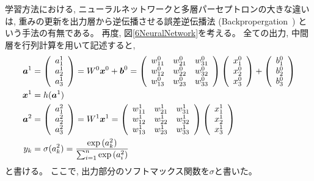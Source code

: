 学習方法における, ニューラルネットワークと多層パーセプトロンの大きな違いは, 重みの更新を出力層から逆伝播させる誤差逆伝播法 (Backpropergation~\cite{Backpropagation}) という手法の有無である。
再度, 図\ref{6NeuralNetwork}を考える。
全ての出力, 中間層を行列計算を用いて記述すると, 
\begin{equation}
 \begin{split}
  {\mbox{\boldmath{$a$}}}^1&=
  \left(
    \begin{array}{ccc}
      a^1_1 \\
      a^1_2 \\
      a^1_3 
    \end{array}
  \right)
  =
  W^0{\mbox{\boldmath{$x$}}}^0 + {\mbox{\boldmath{$b$}}}^0
  =
  \left(
    \begin{array}{ccc}
      w^0_{11} & w^0_{21} & w^0_{31} \\
      w^0_{12} & w^0_{22} & w^0_{32} \\
      w^0_{13} & w^0_{23} & w^0_{33}
    \end{array}
  \right)
  \left(
    \begin{array}{ccc}
      x^0_1 \\
      x^0_2 \\
      x^0_3
    \end{array}
  \right)
  +
  \left(
    \begin{array}{ccc}
      b^0_1 \\
      b^0_2 \\
      b^0_3
    \end{array}
  \right)\\
  {\mbox{\boldmath{$x$}}}^1&=h({\mbox{\boldmath{$a$}}}^1)\\
  {\mbox{\boldmath{$a$}}}^2&=
  \left(
    \begin{array}{ccc}
      a^2_1 \\
      a^2_2 \\
      a^2_3 
    \end{array}
  \right)
  =
  W^1{\mbox{\boldmath{$x$}}}^1
  =
  \left(
    \begin{array}{ccc}
      w^1_{11} & w^1_{21} & w^1_{31} \\
      w^1_{12} & w^1_{22} & w^1_{32} \\
      w^1_{13} & w^1_{23} & w^1_{33}
    \end{array}
  \right)
  \left(
    \begin{array}{ccc}
      x^1_1 \\
      x^1_2 \\
      x^1_3
    \end{array}
  \right)\\
 y_k &= \sigma(a^2_k) = \frac{\exp{(a^2_k)}}{\sum^n_{i=1}\exp{(a^2_i)}}
 \end{split}
\end{equation}
と書ける。
ここで, 出力部分のソフトマックス関数を$\sigma$と書いた。

